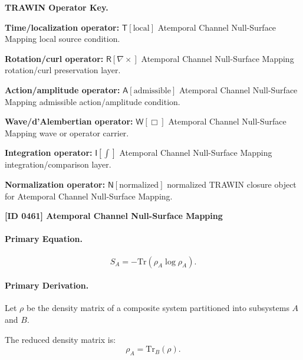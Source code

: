 \par\vspace{0.45\baselineskip}
\noindent\begin{minipage}[t]{\linewidth}
\begingroup
\small
\raggedright
\textbf{TRAWIN Operator Key.}\par
\noindent\textbf{Time/localization operator:} $\mathsf{T}\!\left[\mathrm{local}\right]$ Atemporal Channel Null-Surface Mapping local source condition.\par
\noindent\textbf{Rotation/curl operator:} $\mathsf{R}\!\left[\nabla\times\right]$ Atemporal Channel Null-Surface Mapping rotation/curl preservation layer.\par
\noindent\textbf{Action/amplitude operator:} $\mathsf{A}\!\left[\mathrm{admissible}\right]$ Atemporal Channel Null-Surface Mapping admissible action/amplitude condition.\par
\noindent\textbf{Wave/d'Alembertian operator:} $\mathsf{W}\!\left[\Box\right]$ Atemporal Channel Null-Surface Mapping wave or operator carrier.\par
\noindent\textbf{Integration operator:} $\mathsf{I}\!\left[\int\right]$ Atemporal Channel Null-Surface Mapping integration/comparison layer.\par
\noindent\textbf{Normalization operator:} $\mathsf{N}\!\left[\mathrm{normalized}\right]$ normalized TRAWIN closure object for Atemporal Channel Null-Surface Mapping.\par
\endgroup
\end{minipage}

\clearpage
\noindent\textbf{[ID 0461] Atemporal Channel Null-Surface Mapping}\par
\vspace{0.35em}
\paragraph{Primary Equation.}
\begin{equation}
S_A = -\mathrm{Tr}(\rho_A \log \rho_A).
\end{equation}

\paragraph{Primary Derivation.}
Let $\rho$ be the density matrix of a composite system partitioned into subsystems $A$ and $B$.

The reduced density matrix is:
\begin{equation}
\rho_A = \mathrm{Tr}_B(\rho).
\end{equation}

